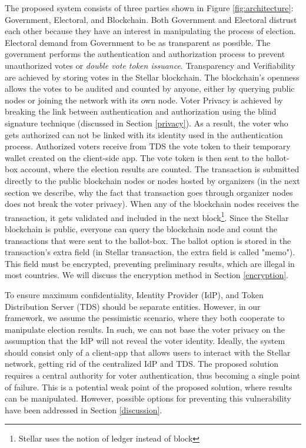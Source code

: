 \documentclass[applsci,article,submit,moreauthors,pdftex]{Definitions/mdpi}
\begin{document}
The proposed system consists of three parties shown in Figure \ref{fig:architecture}: Government, Electoral, and Blockchain. Both Government and Electoral distrust each other because they have an interest in manipulating the process of election. 
Electoral demand from Government to be as transparent as possible. The government performs the authentication and authorization process to prevent unauthorized votes or \textit{double vote token issuance}. Transparency and Verifiability are achieved by storing votes in the Stellar blockchain. The blockchain's openness allows the votes to be audited and counted by anyone, either by querying public nodes or joining the network with its own node. Voter Privacy is achieved by breaking the link between authentication and authorization using the blind signature technique (discussed in Section \ref{privacy}). As a result, the voter who gets authorized can not be linked with its identity used in the authentication process.
Authorized voters receive from TDS the vote token to their temporary wallet created on the client-side app. The vote token is then sent to the ballot-box account, where the election results are counted. The transaction is submitted directly to the public blockchain nodes or nodes hosted by organizers (in the next section we describe, why the fact that transaction goes through organizer nodes does not break the voter privacy). When any of the blockchain nodes receives the transaction, it gets validated and included in the next block\footnote{Stellar uses the notion of ledger instead of block}. Since the Stellar blockchain is public, everyone can query the blockchain node and count the transactions that were sent to the ballot-box. The ballot option is stored in the transaction's extra field (in Stellar transaction, the extra field is called "memo"). This field must be encrypted, preventing preliminary results, which are illegal in most countries. We will discuss the encryption method in Section \ref{encryption}.


To ensure maximum confidentiality, Identity Provider (IdP), and Token Distribution Server (TDS) should be separate entities. However, in our framework, we assume the pessimistic scenario, where they both cooperate to manipulate election results. In such, we can not base the voter privacy on the assumption that the IdP will not reveal the voter identity.
Ideally, the system should consist only of a client-app that allows users to interact with the Stellar network, getting rid of the centralized IdP and TDS. 
The proposed solution requires a central authority for voter authentication, thus becoming a single point of failure. 
This is a potential weak point of the proposed solution, where results can be manipulated. However, possible options for preventing this vulnerability have been addressed in Section \ref{discussion}.
\end{document}
